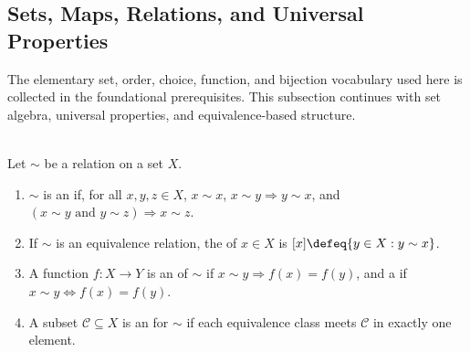 \subsection{Sets, Maps, Relations, and Universal Properties}

The elementary set, order, choice, function, and bijection vocabulary used here is collected in the foundational prerequisites. This subsection continues with set algebra, universal properties, and equivalence-based structure.

\begin{definition} \label{def:equivalence-relation} \label{def:equivalence-classes-invariants-canonical-forms} \\
Let $\sim$ be a relation on a set $X$.
\begin{enumerate}[label=(\roman*)]
\setlength{\itemsep}{0pt}
\item $\sim$ is an  if, for all $x,y,z\in X$, $x\sim x$, $x\sim y\Rightarrow y\sim x$, and $(x\sim y\text{ and }y\sim z)\Rightarrow x\sim z$.
\item If $\sim$ is an equivalence relation, the  of $x\in X$ is $[x]\defeq\{y\in X:y\sim x\}$.
\item A function $f:X\to Y$ is an  of $\sim$ if $x\sim y\Rightarrow f(x)=f(y)$, and a  if $x\sim y\Longleftrightarrow f(x)=f(y)$.
\item A subset $\mathcal{C}\subseteq X$ is an  for $\sim$ if each equivalence class meets $\mathcal{C}$ in exactly one element.
\end{enumerate}
\end{definition}
